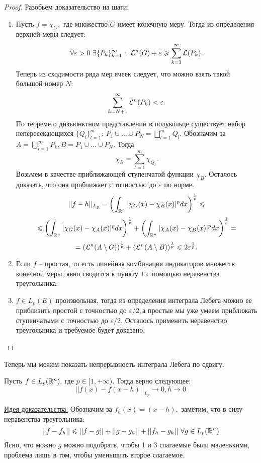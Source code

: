 \begin{proof} Разобьем доказательство на шаги:

\begin{enumerate}
    \item Пусть $f = \chi_{G},$ где множество $G$ имеет конечную меру. Тогда из определения верхней меры следует:
    $$\forall \varepsilon > 0 \ \exists \{P_{k}\}_{k = 1}^{\infty} : \ \mathcal{L}^n(G) + \varepsilon \geqslant \sum_{k  =1}^{\infty}\mathcal{L}(P_k).$$
    Теперь из сходимости ряда мер ячеек следует, что можно взять такой большой номер $N:$
    $$\sum_{k = N + 1}^{\infty} \mathcal{L}^n(P_k) < \varepsilon.$$
    По теореме о дизъюнктном представлении в полукольце существует набор непересекающихся $\{Q_l\}_{l = 1}^{m}: \ P_1 \cup \ldots \cup P_N = \bigsqcup_{l = 1}^mQ_l.$ Обозначим за $A = \bigcup_{i = 1}^{\infty} P_k,  B = P_1 \cup \ldots \cup P_N.$ Тогда
    $$\chi_{B} = \sum_{l = 1}^{m}\chi_{Q_l}.$$
    Возьмем в качестве приближающей ступенчатой функции $\chi_{B}.$ Осталось доказать, что она приближает с точностью до $\varepsilon$ по норме.
    $$||f - h||_{L_p} = \left( \int_{\mathbb{R}^n} |\chi_G(x) - \chi_B(x)|^p dx\right)^{\frac{1}{p}} \leqslant$$
    $$\leqslant \left( \int_{\mathbb{R}^n} |\chi_G(x) - \chi_A(x)|^p dx\right)^{\frac{1}{p}} + \left( \int_{\mathbb{R}^n} |\chi_A(x) - \chi_B(x)|^p dx\right)^{\frac{1}{p}} = $$
    $$= \left( \mathcal{L}^n(A \setminus G)\right)^{\frac{1}{p}} + \left( \mathcal{L}^n(A \setminus B) \right)^{\frac{1}{p}} \leqslant 2\varepsilon^{\frac{1}{p}}.$$
    \item Если $f$ -- простая, то есть линейная комбинация индикаторов множеств конечной меры, явно сводится к пункту $1$ с помощью неравенства треугольника.
    \item $f \in L_p(E)$ произвольная, тогда из определения интеграла Лебега можно ее приблизить простой с точностью до $\varepsilon / 2, $а простые мы уже умеем приближать ступенчатыми с точностью до $\varepsilon / 2.$ Осталось применить неравенство треугольника и требуемое будет доказано.
\end{enumerate}
\end{proof}

Теперь мы можем показать непрерывность интеграла Лебега по сдвигу.
\begin{theorem}
    Пусть $f \in L_p(\mathbb{R}^n), $ где $p \in [1, +\infty).$ Тогда верно следующее:
    $$||f(x) - f(x - h)||_{L_p} \rightarrow 0, h \rightarrow 0$$
\end{theorem}

\underline{Идея доказательства:} Обозначим за $f_h(x) = (x - h),$ заметим, что в силу неравенства треугольника:
$$||f - f_h|| \leqslant ||f - g|| + ||g - g_h|| + ||f_h - g_h|| \ \forall g \in L_p(\mathbb{R}^n)$$
Ясно, что можно $g$ можно подобрать, чтобы 1 и 3 слагаемые были маленькими, проблема лишь в том, чтобы уменьшить второе слагаемое.

